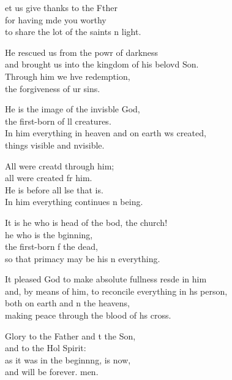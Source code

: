 \settowidth{\versewidth}{and, by means of him, to reconcile everything in his person,}
\begin{psalmverse}%
  \begin{patverse}
et us give thanks to the Fther\Flex\\
for having mde you worthy\Med\\
to share the lot of the saints \pointup{\i}n light.

He rescued us from the powr of darkness\Med\\
and brought us into the kingdom of his belovd Son.\\
Through him we hve redemption,\Med\\
the forgiveness of ur sins.

He is the image of the invis\pointup{\i}ble God,\Med\\
the first-born of ll creatures.\\
In him everything in heaven and on earth ws created,\Med\\
things visible and \pointup{\i}nvisible.

All were creatd through him;\Med\\
all were created fr him.\\
He is before all lse that is.\Med\\
In him everything continues \pointup{\i}n being.

It is he who is head of the bod, the church!\Med\\
he who is the bginning,\\
the first-born f the dead,\Med\\
so that primacy may be his \pointup{\i}n everything.

It pleased God to make absolute fullness res\pointup{\i}de in him\Med\\
and, by means of him, to reconcile everything in h\pointup{\i}s person,\\
both on earth and \pointup{\i}n the heavens,\Med\\
making peace through the blood of h\pointup{\i}s cross.

Glory to the Father and t the Son,\Med\\
and to the Hol Spirit:\\
as it was in the beginn\pointup{\i}ng, is now,\Med\\
and will be forever. men. 
  \end{patverse}
\end{psalmverse}
